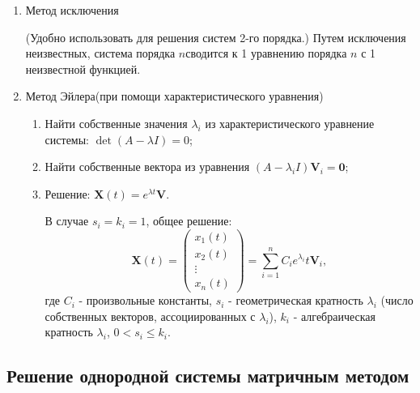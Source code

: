 \documentclass[a5paper,10pt]{article}
\begin{document}
			\begin{enumerate}
				\item Метод исключения \par
				(Удобно использовать для решения систем 2-го порядка.) Путем исключения неизвестных, система порядка $n$сводится к 1 уравнению порядка $n$ с 1 неизвестной функцией.

				\item Метод Эйлера(при помощи характеристического уравнения) \par
				\begin{enumerate}
					\item Найти собственные значения $ \lambda_i $ из характеристического уравнение системы: $ \det \left( {A - \lambda I} \right) = 0 $;

					\item Найти собственные вектора из уравнения $ \left( {A - {\lambda _i}I} \right){\mathbf{V}_i} = \mathbf{0} $;

					\item Решение: $ \mathbf{X}(t) = e^{\lambda t}\mathbf{V} $.
					\begin{framed}
						В случае $s_i = k_i = 1$, общее решение:
						\begin{equation}
							\mathbf{X}(t) = \left(
								\begin{array}{*{20}{c}}
									{{x_1}\left( t \right)}\\
									{{x_2}\left( t \right)}\\
									 \vdots \\
									{{x_n}\left( t \right)}
								\end{array}
							\right)
							= \sum\limits_{i=1}^n C_ie^{\lambda_i}t\mathbf{V}_i,
						\end{equation}
						где $ C_i $ - произвольные константы, $s_i$ - геометрическая кратность $\lambda_i$ (число собственных векторов, ассоциированных с $\lambda_i$), $k_i$ - алгебраическая кратность $\lambda_i$, $ 0 < s_i \leq k_i $.
					\end{framed}
				\end{enumerate}
			\end{enumerate}

		\subsection{Решение однородной системы матричным методом}
\end{document}

